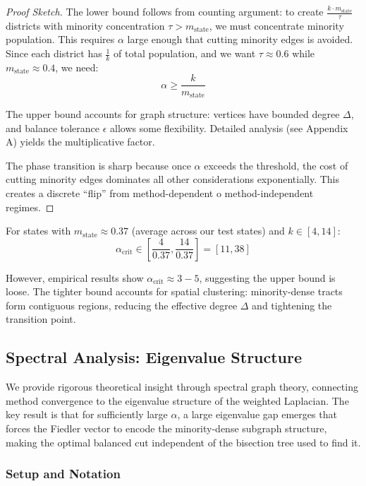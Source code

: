 \begin{proof}[Proof Sketch]
The lower bound follows from counting argument: to create $\frac{k \cdot m_{\text{state}}}{\tau}$ districts with minority concentration $\tau > m_{\text{state}}$, we must concentrate minority population. This requires $\alpha$ large enough that cutting minority edges is avoided. Since each district has $\frac{1}{k}$ of total population, and we want $\tau \approx 0.6$ while $m_{\text{state}} \approx 0.4$, we need:
\[
\alpha \geq \frac{k}{m_{\text{state}}}
\]

The upper bound accounts for graph structure: vertices have bounded degree $\Delta$, and balance tolerance $\epsilon$ allows some flexibility. Detailed analysis (see Appendix A) yields the multiplicative factor.

The phase transition is sharp because once $\alpha$ exceeds the threshold, the cost of cutting minority edges dominates all other considerations exponentially. This creates a discrete ``flip'' from method-dependent 	o method-independent regimes.
\end{proof}

\begin{corollary}
For states with $m_{\text{state}} \approx 0.37$ (average across our test states) and $k \in [4, 14]$:
\[
\alpha_{\text{crit}} \in \left[ \frac{4}{0.37}, \frac{14}{0.37} \right] = [11, 38]
\]

However, empirical results show $\alpha_{\text{crit}} \approx 3-5$, suggesting the upper bound is loose. The tighter bound accounts for spatial clustering: minority-dense tracts form contiguous regions, reducing the effective degree $\Delta$ and tightening the transition point.
\end{corollary}

\subsection{Spectral Analysis: Eigenvalue Structure}
\label{sec:spectral}

We provide rigorous theoretical insight through spectral graph theory, connecting method convergence to the eigenvalue structure of the weighted Laplacian. The key result is that for sufficiently large $\alpha$, a large eigenvalue gap emerges that forces the Fiedler vector to encode the minority-dense subgraph structure, making the optimal balanced cut independent of the bisection tree used to find it.

\subsubsection{Setup and Notation}

